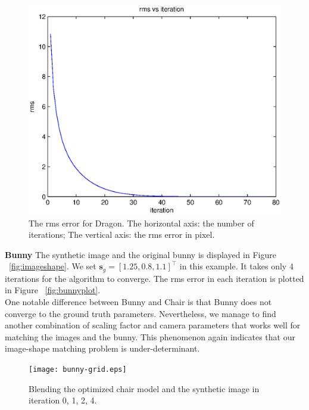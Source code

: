 \documentclass[10pt,twocolumn,letterpaper]{article}
\begin{document}
\begin{figure}[b]
\begin{center}
	\includegraphics[scale=0.5]{dragon-figure.eps}
\end{center}
	\caption{The rms error for Dragon. The horizontal axis: the number of iterations; The vertical axis: the rms error in pixel.}
\label{fig:dragonplot}
\end{figure}

\noindent
\textbf{Bunny} The synthetic image and the original bunny is displayed in Figure ~\ref{fig:imageshape}. We set $\mathbf{s}_g=[1.25, 0.8, 1.1]^\top$ in this example. It takes only 4 iterations for the algorithm to converge. The rms error in each iteration is plotted in Figure ~\ref{fig:bunnyplot}.\\

\noindent
One notable difference between Bunny and Chair is that Bunny does not converge to the ground truth parameters. Nevertheless, we manage to find another combination of scaling factor and camera parameters that works well for matching the images and the bunny. This phenomenon again indicates that our image-shape matching problem is under-determinant.

\begin{figure}[t]
\begin{center}
	\texttt{[image: bunny-grid.eps]}
\end{center}
   \caption{Blending the optimized chair model and the synthetic image in iteration 0, 1, 2, 4.}
\label{fig:bunnygrid}
\end{figure}
\end{document}

